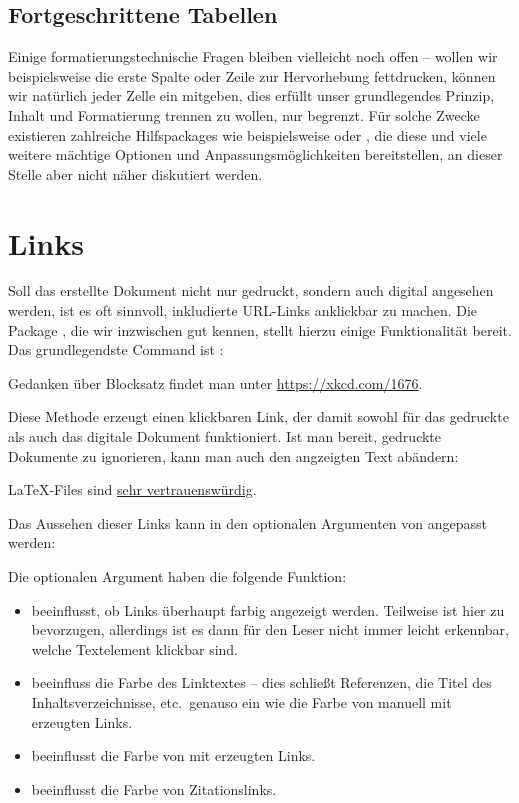 \subsection{Fortgeschrittene Tabellen}
Einige formatierungstechnische Fragen bleiben vielleicht noch offen -- wollen wir beispielsweise die erste Spalte oder Zeile zur Hervorhebung fettdrucken, können wir natürlich jeder Zelle ein  mitgeben, dies erfüllt unser grundlegendes Prinzip, Inhalt und Formatierung trennen zu wollen, nur begrenzt.
Für solche Zwecke existieren zahlreiche Hilfspackages wie beispielsweise  oder , die diese und viele weitere mächtige Optionen und Anpassungsmöglichkeiten bereitstellen, an dieser Stelle aber nicht näher diskutiert werden.

\section{Links}
Soll das erstellte Dokument nicht nur gedruckt, sondern auch digital angesehen werden, ist es oft sinnvoll, inkludierte URL-Links anklickbar zu machen.
Die Package , die wir inzwischen gut kennen, stellt hierzu einige Funktionalität bereit.
Das grundlegendste Command ist :
\begin{latexlisting}
	Gedanken über Blocksatz findet man unter \url{https://xkcd.com/1676}.
\end{latexlisting}
Diese Methode erzeugt einen klickbaren Link, der damit sowohl für das gedruckte als auch das digitale Dokument funktioniert.
Ist man bereit, gedruckte Dokumente zu ignorieren, kann man auch den angzeigten Text abändern:
\begin{latexlisting}
	\LaTeX{}-Files sind \href{https://xkcd.com/1301}{sehr vertrauenswürdig}.
\end{latexlisting}
Das Aussehen dieser Links kann in den optionalen Argumenten von  angepasst werden:
\begin{latexlisting}
	\usepackage[
		colorlinks=true,
		linkcolor=black,
		urlcolor=red,
		citecolor=purple,
	]{hyperref}
\end{latexlisting}
Die optionalen Argument haben die folgende Funktion:
\begin{itemize}
	\item {} beeinflusst, ob Links überhaupt farbig angezeigt werden.
	Teilweise ist hier  zu bevorzugen, allerdings ist es dann für den Leser nicht immer leicht erkennbar, welche Textelement klickbar sind.
	\item {} beeinfluss die Farbe des Linktextes -- dies schließt Referenzen, die Titel des Inhaltsverzeichnisse, etc.\ genauso ein wie die Farbe von manuell mit  erzeugten Links.
	\item {} beeinflusst die Farbe von mit  erzeugten Links.
	\item {} beeinflusst die Farbe von Zitationslinks.
\end{itemize}

